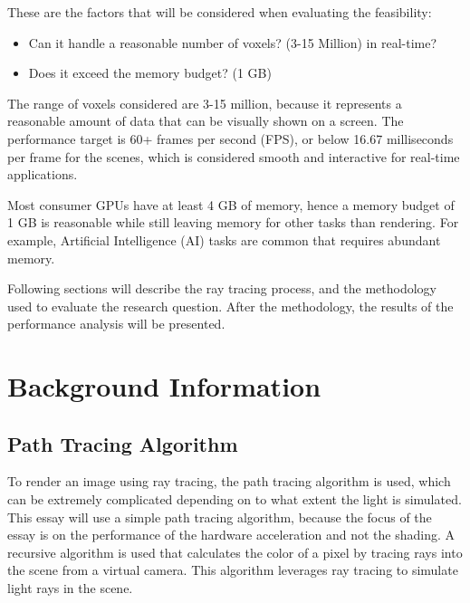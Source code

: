\documentclass[12pt]{article}
\begin{document}
These are the factors that will be considered when evaluating the feasibility:
\begin{itemize}
    \itemsep0em
    \item Can it handle a reasonable number of voxels? (3-15 Million) in real-time?
    \item Does it exceed the memory budget? (1 GB)
\end{itemize}

The range of voxels considered are 3-15 million, because it represents a reasonable amount of data that can be visually shown on a screen.
The performance target is 60+ frames per second (FPS), or below 16.67 milliseconds per frame for the scenes, which is considered
smooth and interactive for real-time applications.

Most consumer GPUs have at least 4 GB of memory, hence a memory budget of 1 GB is reasonable while still leaving memory for other tasks than rendering.
For example, Artificial Intelligence (AI) tasks are common that requires abundant memory.


Following sections will describe the ray tracing process, and the methodology used to evaluate the research question.
After the methodology, the results of the performance analysis will be presented.

\section{Background Information}

\subsection{Path Tracing Algorithm}

To render an image using ray tracing, the path tracing algorithm is used, which can be extremely complicated depending on to what extent the light is simulated.
This essay will use a simple path tracing algorithm, because the focus of the essay is on the performance of the hardware acceleration and not the shading.
A recursive algorithm is used that calculates the color of a pixel by tracing rays into the scene from a virtual camera.
This algorithm leverages ray tracing to simulate light rays in the scene.
\end{document}
